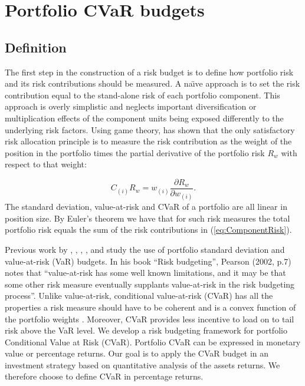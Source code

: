 \documentclass[12pt,a4paper]{article}
\begin{document}
\section{Portfolio CVaR budgets \label{sec:CVaRbudgets}}

\subsection{Definition}

The first step in the construction of a risk budget is to define how portfolio risk and its risk contributions should be measured. A na\"{\i}ve approach is to set the risk contribution equal to the stand-alone risk of each portfolio component. This approach is overly simplistic and neglects important diversification or multiplication effects of the component units being exposed differently to the underlying risk factors. Using game theory, \citet{Denault2001} has shown that the only satisfactory risk allocation principle is to measure the risk contribution as the weight of the position in the portfolio times the partial derivative of the portfolio risk  $R_w$ with respect to that weight:

\begin{equation}  C_{(i)}R_w = w_{(i)}\frac{\partial R_w}{\partial w_{(i)}}. \label{eq:ComponentRisk}\end{equation}
The standard deviation, value-at-risk and CVaR of a portfolio are all linear in position size. By Euler's theorem we have that for such risk measures the total portfolio risk equals the sum of the risk contributions in (\ref{eq:ComponentRisk}).


Previous work by \citet{Chow2001}, \citet{Litterman1996}, \citet{Maillard2010}, \citet{Peterson2008}, and \citet{Scherer2007} study the use of portfolio standard deviation and value-at-risk (VaR) budgets. In his book ``Risk budgeting'', \nocite{Pearson2002} Pearson (2002, p.7) notes that ``value-at-risk has some well known limitations, and it may be that some other risk measure eventually supplants value-at-risk in the risk budgeting process''. Unlike value-at-risk, conditional value-at-risk (CVaR) has all the properties a risk measure should have to be coherent and is a convex function of the portfolio weights \citep{Artzner1999, Pflug2000}. Moreover, CVaR provides less incentive to load on to tail risk above the VaR level.
We develop a risk budgeting framework for portfolio Conditional Value at Risk (CVaR). Portfolio CVaR can be expressed in monetary value or percentage returns. Our goal is to apply the CVaR budget in an investment strategy based on quantitative analysis of the assets returns. We therefore choose to define CVaR in percentage returns.
\end{document}
